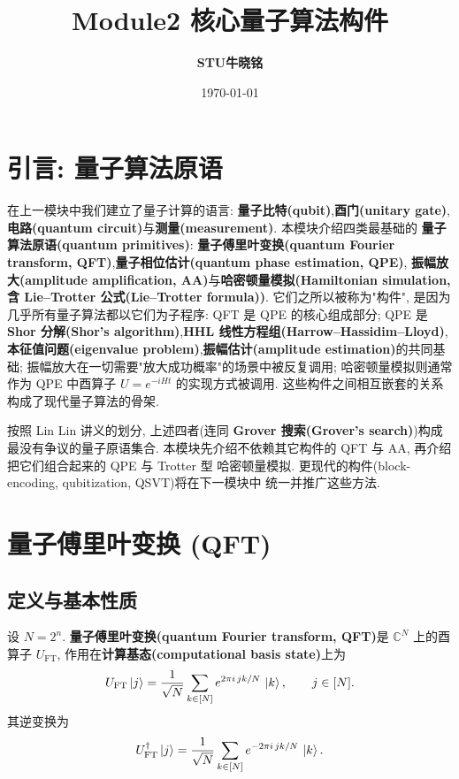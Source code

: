 \documentclass[utf8]{article} %
\title{\textbf{Module2 核心量子算法构件}}
\date{\today}
\author{\textbf{STU\quad 牛晓铭}}
\numberwithin{equation}{section}   %
\newtheorem{Def}{\hskip 2em {\color{green} 定义}}[subsection]
\newtheorem{Note}{\hskip 2em {\color{red} 注}}[subsection]
\begin{document}
  
\maketitle
\renewcommand{\contentsname}{} 
\tableofcontents
\thispagestyle{empty}
	
\newpage
\setcounter{page}{1}
\section{引言: 量子算法原语}

在上一模块中我们建立了量子计算的语言: \textbf{量子比特(qubit)},\textbf{酉门(unitary gate)},\textbf{电路(quantum circuit)}与\textbf{测量(measurement)}. 本模块介绍四类最基础的
\textbf{量子算法原语(quantum primitives)}: \textbf{量子傅里叶变换(quantum Fourier transform, QFT)},\textbf{量子相位估计(quantum phase estimation, QPE)},
\textbf{振幅放大(amplitude amplification, AA)}与\textbf{哈密顿量模拟(Hamiltonian simulation, 含 Lie--Trotter 公式(Lie--Trotter formula))}.
它们之所以被称为"构件", 是因为几乎所有量子算法都以它们为子程序:
QFT 是 QPE 的核心组成部分; QPE 是 \textbf{Shor 分解(Shor's algorithm)},\textbf{HHL 线性方程组(Harrow--Hassidim--Lloyd)},\textbf{本征值问题(eigenvalue problem)},\textbf{振幅估计(amplitude estimation)}的共同基础;
振幅放大在一切需要"放大成功概率"的场景中被反复调用; 哈密顿量模拟则通常作为 QPE 中酉算子
$U = e^{-iHt}$ 的实现方式被调用. 这些构件之间相互嵌套的关系构成了现代量子算法的骨架.

\begin{Note}
    按照 Lin Lin 讲义的划分, 上述四者(连同 \textbf{Grover 搜索(Grover's search)})构成最没有争议的量子原语集合.
    本模块先介绍不依赖其它构件的 QFT 与 AA, 再介绍把它们组合起来的 QPE 与 Trotter 型
    哈密顿量模拟. 更现代的构件(block-encoding, qubitization, QSVT)将在下一模块中
    统一并推广这些方法.
\end{Note}

\section{量子傅里叶变换 (QFT)}

\subsection{定义与基本性质}

\begin{Def}
    设 $N = 2^n$. \textbf{量子傅里叶变换(quantum Fourier transform, QFT)}是
    $\mathbb{C}^N$ 上的酉算子 $U_{\mathrm{FT}}$, 作用在\textbf{计算基态(computational basis state)}上为
    \begin{equation}
        U_{\mathrm{FT}} \ket{j} = \frac{1}{\sqrt{N}} \sum_{k \in [N]} e^{2\pi i\, jk/N}\, \ket{k},
        \qquad j \in [N].
    \end{equation}
    其逆变换为
    \begin{equation}
        U_{\mathrm{FT}}^\dagger \ket{j} = \frac{1}{\sqrt{N}} \sum_{k \in [N]} e^{-2\pi i\, jk/N}\, \ket{k}.
    \end{equation}
\end{Def}
\end{document}
